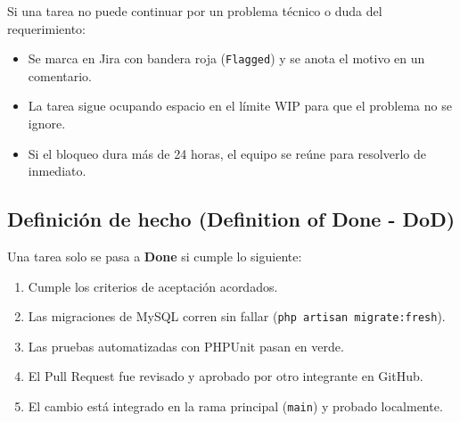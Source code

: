 Si una tarea no puede continuar por un problema técnico o duda del requerimiento:
\begin{itemize}[nosep]
    \item Se marca en Jira con bandera roja (\texttt{Flagged}) y se anota el motivo en un comentario.
    \item La tarea sigue ocupando espacio en el límite WIP para que el problema no se ignore.
    \item Si el bloqueo dura más de 24 horas, el equipo se reúne para resolverlo de inmediato.
\end{itemize}

\subsection{Definición de hecho (Definition of Done - DoD)}

Una tarea solo se pasa a \textbf{Done} si cumple lo siguiente:
\begin{enumerate}[nosep]
    \item Cumple los criterios de aceptación acordados.
    \item Las migraciones de MySQL corren sin fallar (\texttt{php artisan migrate:fresh}).
    \item Las pruebas automatizadas con PHPUnit pasan en verde.
    \item El Pull Request fue revisado y aprobado por otro integrante en GitHub.
    \item El cambio está integrado en la rama principal (\texttt{main}) y probado localmente.
\end{enumerate}
